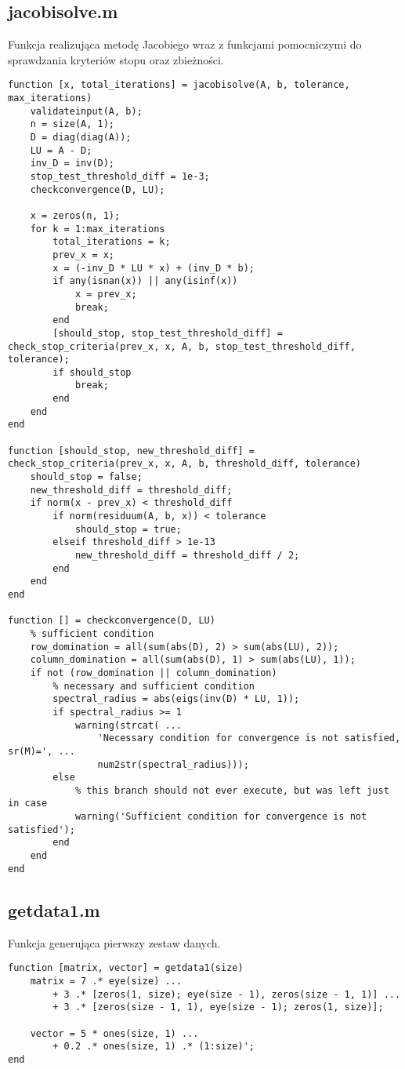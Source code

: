 \documentclass[12pt]{article}
\begin{document}
\subsection{jacobisolve.m}
Funkcja realizująca metodę Jacobiego wraz z funkcjami pomocniczymi do sprawdzania kryteriów stopu oraz zbieżności.
\begin{verbatim}
function [x, total_iterations] = jacobisolve(A, b, tolerance, max_iterations)
    validateinput(A, b);
    n = size(A, 1);
    D = diag(diag(A));
    LU = A - D;
    inv_D = inv(D);
    stop_test_threshold_diff = 1e-3;
    checkconvergence(D, LU);

    x = zeros(n, 1);
    for k = 1:max_iterations
        total_iterations = k;
        prev_x = x;
        x = (-inv_D * LU * x) + (inv_D * b);
        if any(isnan(x)) || any(isinf(x))
            x = prev_x;
            break;
        end
        [should_stop, stop_test_threshold_diff] = check_stop_criteria(prev_x, x, A, b, stop_test_threshold_diff, tolerance);
        if should_stop
            break;
        end
    end
end

function [should_stop, new_threshold_diff] = check_stop_criteria(prev_x, x, A, b, threshold_diff, tolerance)
    should_stop = false;
    new_threshold_diff = threshold_diff;
    if norm(x - prev_x) < threshold_diff
        if norm(residuum(A, b, x)) < tolerance
            should_stop = true;
        elseif threshold_diff > 1e-13
            new_threshold_diff = threshold_diff / 2;
        end
    end
end

function [] = checkconvergence(D, LU)
    % sufficient condition
    row_domination = all(sum(abs(D), 2) > sum(abs(LU), 2));
    column_domination = all(sum(abs(D), 1) > sum(abs(LU), 1));
    if not (row_domination || column_domination)
        % necessary and sufficient condition
        spectral_radius = abs(eigs(inv(D) * LU, 1));
        if spectral_radius >= 1
            warning(strcat( ...
                'Necessary condition for convergence is not satisfied, sr(M)=', ...
                num2str(spectral_radius)));
        else
            % this branch should not ever execute, but was left just in case
            warning('Sufficient condition for convergence is not satisfied');
        end
    end
end
\end{verbatim}

\subsection{getdata1.m}
Funkcja generująca pierwszy zestaw danych.
\begin{verbatim}
function [matrix, vector] = getdata1(size)
    matrix = 7 .* eye(size) ...
        + 3 .* [zeros(1, size); eye(size - 1), zeros(size - 1, 1)] ...
        + 3 .* [zeros(size - 1, 1), eye(size - 1); zeros(1, size)];

    vector = 5 * ones(size, 1) ...
        + 0.2 .* ones(size, 1) .* (1:size)';
end
\end{verbatim}
\end{document}
